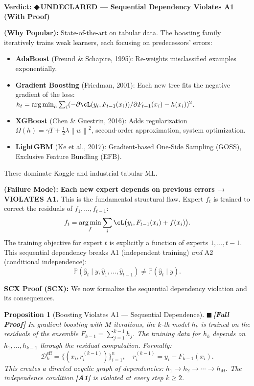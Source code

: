 \documentclass[12pt,a4paper]{article}
\newtheorem{proposition}[theorem]{Proposition}
\theoremstyle{definition}
\newcommand{\rigorFull}{{\color{rigorcolor}$\blacksquare$\,\textbf{[Full Proof]}}}
\newcommand{\guilty}{{\color{guiltycolor}\textbf{◆\,UNDECLARED}}}
\DeclareMathOperator*{\argmin}{arg\,min}
\newcommand{\Pbb}{\mathbb{P}}
\newcommand{\cD}{\mathcal{D}}
\newcommand{\norm}[1]{\left\lVert#1\right\rVert}
\newcommand{\asmTag}[1]{\textsf{\textbf{[A#1]}}}
\newcommand{\auditHeader}[1]{\medskip\noindent\textbf{\large #1}\medskip}
\newcommand{\whyPopular}{\noindent\textbf{ (Why Popular):} }
\newcommand{\whyFail}{\noindent\textbf{ (Failure Mode):} }
\newcommand{\scxProof}{\noindent\textbf{SCX Proof (SCX):} }
\begin{document}
\auditHeader{Verdict: \guilty{} — Sequential Dependency Violates A1 (With Proof)}

\whyPopular{} State-of-the-art on tabular data. The boosting family iteratively trains weak learners, each focusing on predecessors' errors:
\begin{itemize}[nosep]
    \item \textbf{AdaBoost} (Freund \& Schapire, 1995): Re-weights misclassified examples exponentially.
    \item \textbf{Gradient Boosting} (Friedman, 2001): Each new tree fits the negative gradient of the loss: $h_t = \argmin_h \sum_i (-\partial \cL(y_i, F_{t-1}(x_i)) / \partial F_{t-1}(x_i) - h(x_i))^2$.
    \item \textbf{XGBoost} (Chen \& Guestrin, 2016): Adds regularization $\Omega(h) = \gamma T + \frac{1}{2}\lambda\norm{w}^2$, second-order approximation, system optimization.
    \item \textbf{LightGBM} (Ke et al., 2017): Gradient-based One-Side Sampling (GOSS), Exclusive Feature Bundling (EFB).
\end{itemize}
These dominate Kaggle and industrial tabular ML.

\whyFail{} \textbf{Each new expert depends on previous errors → VIOLATES A1.} This is the fundamental structural flaw. Expert $f_t$ is trained to correct the residuals of $f_1, \ldots, f_{t-1}$:
\[
f_t = \argmin_f \sum_i \cL\bigl(y_i, F_{t-1}(x_i) + f(x_i)\bigr).
\]
The training objective for expert $t$ is explicitly a function of experts $1, \ldots, t-1$. This sequential dependency breaks A1 (independent training) \textit{and} A2 (conditional independence):
\[
\Pbb(\hat{y}_t \mid y, \hat{y}_1, \ldots, \hat{y}_{t-1}) \neq \Pbb(\hat{y}_t \mid y).
\]

\scxProof{} We now formalize the sequential dependency violation and its consequences.

\begin{proposition}[Boosting Violates A1 — Sequential Dependence]\label{prop:boosting_violation}
\rigorFull
In gradient boosting with $M$ iterations, the $k$-th model $h_k$ is trained on the residuals of the ensemble $F_{k-1} = \sum_{j=1}^{k-1} h_j$. The training data for $h_k$ depends on $h_1, \ldots, h_{k-1}$ through the residual computation. Formally:
\begin{equation}\label{eq:boosting_dep}
    \cD_k^{\text{eff}} = \{(x_i, r_i^{(k-1)})\}_{i=1}^n, \quad r_i^{(k-1)} = y_i - F_{k-1}(x_i).
\end{equation}
This creates a directed acyclic graph of dependencies: $h_1 \to h_2 \to \cdots \to h_M$. The independence condition \asmTag{1} is violated at every step $k \ge 2$.
\end{proposition}
\end{document}
